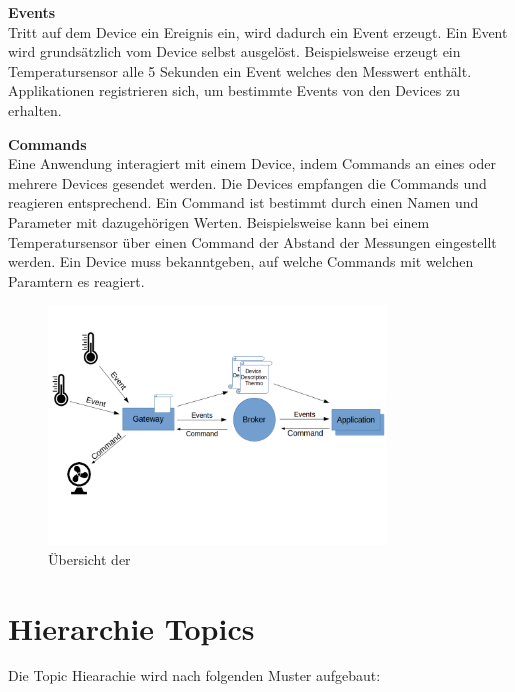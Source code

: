 \textbf{Events} \\
Tritt auf dem Device ein Ereignis ein, wird dadurch ein Event erzeugt. Ein Event wird grundsätzlich vom Device selbst ausgelöst. Beispielsweise erzeugt ein Temperatursensor alle 5 Sekunden ein Event welches den Messwert enthält. Applikationen registrieren sich, um bestimmte Events von den Devices zu erhalten.


\textbf{Commands} \\
Eine Anwendung interagiert mit einem Device, indem Commands an eines oder mehrere Devices gesendet werden. Die Devices empfangen die Commands und reagieren entsprechend. Ein Command ist bestimmt durch einen Namen und Parameter mit dazugehörigen Werten. 
Beispielsweise kann bei einem Temperatursensor über einen Command  der Abstand der Messungen eingestellt werden.
Ein Device muss bekanntgeben, auf welche Commands mit welchen Paramtern es reagiert.


\begin{figure}[H]
	\centering
		\includegraphics[width=0.8\textwidth]{diag/Overview.png}
	\caption{\label{fig:overview}Übersicht der}
\end{figure}


\section{Hierarchie Topics}


Die Topic Hiearachie wird nach folgenden Muster aufgebaut:


